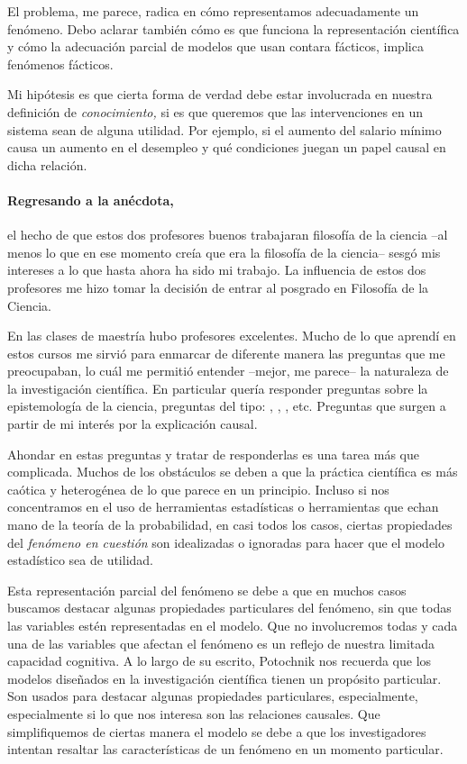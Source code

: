 El problema, me parece, radica en cómo representamos adecuadamente un fenómeno.
Debo aclarar también cómo es que funciona la representación científica y cómo la adecuación parcial de modelos que usan contara fácticos, implica fenómenos fácticos.

Mi hipótesis es que cierta forma de verdad debe estar involucrada en nuestra definición de \emph{conocimiento,} si es que queremos que las intervenciones en un sistema sean de alguna utilidad.
Por ejemplo, si el aumento del salario mínimo causa un aumento en el desempleo y qué condiciones juegan un papel causal en dicha relación.

\paragraph{Regresando a la anécdota,} el hecho de que estos dos profesores buenos trabajaran filosofía de la
ciencia --al menos lo que en ese momento creía que era la filosofía de la ciencia-- sesgó mis intereses a lo que hasta ahora ha sido mi trabajo.
La influencia de estos dos profesores me hizo tomar la decisión de entrar al posgrado en Filosofía de la Ciencia.

En las clases de maestría hubo profesores excelentes.
Mucho de lo que aprendí en estos cursos me sirvió para enmarcar de diferente manera las preguntas que me preocupaban, lo cuál me permitió entender --mejor, me parece-- la naturaleza de la investigación científica.
En particular quería responder preguntas sobre la epistemología de la ciencia, preguntas del tipo: , , , etc.
Preguntas que surgen a partir de mi interés por la explicación causal.

Ahondar en estas preguntas y tratar de responderlas es una tarea más que complicada.
Muchos de los obstáculos se deben a que la práctica científica es más caótica y heterogénea de lo que parece en un principio.
Incluso si nos concentramos en el uso de herramientas estadísticas o herramientas que echan mano de la teoría de la probabilidad, en casi todos los casos, ciertas propiedades del \emph{fenómeno en cuestión} son idealizadas o ignoradas para hacer que el modelo estadístico sea de utilidad.

Esta representación parcial del fenómeno se debe a que en muchos casos buscamos destacar algunas propiedades particulares del fenómeno, sin que todas las variables estén representadas en el modelo.
Que no involucremos todas y cada una de las variables que afectan el fenómeno es un reflejo de nuestra limitada capacidad cognitiva.
A lo largo de su escrito, Potochnik nos recuerda que los modelos diseñados en la investigación científica tienen un propósito particular.
Son usados para destacar algunas propiedades particulares, especialmente, especialmente si lo que nos interesa son las relaciones causales.
Que simplifiquemos de ciertas manera el modelo se debe a que los investigadores intentan resaltar las características de un fenómeno en un momento particular.

